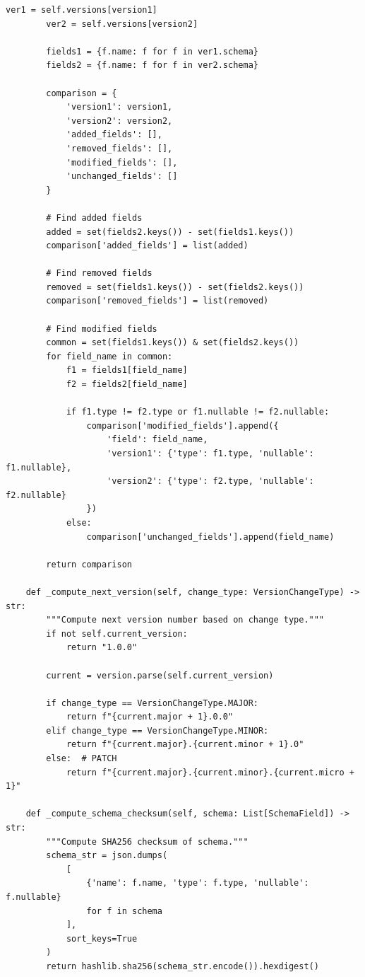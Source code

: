 \begin{lstlisting}[style=python, caption=DataVersionManager with Semantic Versioning]
        ver1 = self.versions[version1]
        ver2 = self.versions[version2]

        fields1 = {f.name: f for f in ver1.schema}
        fields2 = {f.name: f for f in ver2.schema}

        comparison = {
            'version1': version1,
            'version2': version2,
            'added_fields': [],
            'removed_fields': [],
            'modified_fields': [],
            'unchanged_fields': []
        }

        # Find added fields
        added = set(fields2.keys()) - set(fields1.keys())
        comparison['added_fields'] = list(added)

        # Find removed fields
        removed = set(fields1.keys()) - set(fields2.keys())
        comparison['removed_fields'] = list(removed)

        # Find modified fields
        common = set(fields1.keys()) & set(fields2.keys())
        for field_name in common:
            f1 = fields1[field_name]
            f2 = fields2[field_name]

            if f1.type != f2.type or f1.nullable != f2.nullable:
                comparison['modified_fields'].append({
                    'field': field_name,
                    'version1': {'type': f1.type, 'nullable': f1.nullable},
                    'version2': {'type': f2.type, 'nullable': f2.nullable}
                })
            else:
                comparison['unchanged_fields'].append(field_name)

        return comparison

    def _compute_next_version(self, change_type: VersionChangeType) -> str:
        """Compute next version number based on change type."""
        if not self.current_version:
            return "1.0.0"

        current = version.parse(self.current_version)

        if change_type == VersionChangeType.MAJOR:
            return f"{current.major + 1}.0.0"
        elif change_type == VersionChangeType.MINOR:
            return f"{current.major}.{current.minor + 1}.0"
        else:  # PATCH
            return f"{current.major}.{current.minor}.{current.micro + 1}"

    def _compute_schema_checksum(self, schema: List[SchemaField]) -> str:
        """Compute SHA256 checksum of schema."""
        schema_str = json.dumps(
            [
                {'name': f.name, 'type': f.type, 'nullable': f.nullable}
                for f in schema
            ],
            sort_keys=True
        )
        return hashlib.sha256(schema_str.encode()).hexdigest()


\end{lstlisting}
